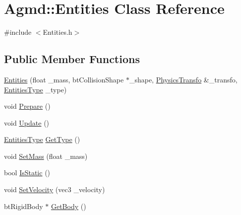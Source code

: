 \hypertarget{class_agmd_1_1_entities}{\section{Agmd\+:\+:Entities Class Reference}
\label{class_agmd_1_1_entities}
}


{\ttfamily \#include $<$Entities.\+h$>$}

\subsection*{Public Member Functions}
\begin{DoxyCompactItemize}
\item 
\hyperlink{class_agmd_1_1_entities_a932acd709716732b383f62e5ffb7277d}{Entities} (float \+\_\+mass, bt\+Collision\+Shape $\ast$\+\_\+shape, \hyperlink{struct_agmd_1_1_physics_transfo}{Physics\+Transfo} \&\+\_\+transfo, \hyperlink{namespace_agmd_a48e386dda635142e369ff15442b2a6ea}{Entities\+Type} \+\_\+type)
\item 
void \hyperlink{class_agmd_1_1_entities_aaef1e03cb169da068302e97a908d5c29}{Prepare} ()
\item 
void \hyperlink{class_agmd_1_1_entities_a47168fa50347e9d2415133339eb31054}{Update} ()
\item 
\hyperlink{namespace_agmd_a48e386dda635142e369ff15442b2a6ea}{Entities\+Type} \hyperlink{class_agmd_1_1_entities_aabd13db74541f1bca1d27f1cb864c638}{Get\+Type} ()
\item 
void \hyperlink{class_agmd_1_1_entities_a934201c790f65005b5801bb41ce3e054}{Set\+Mass} (float \+\_\+mass)
\item 
bool \hyperlink{class_agmd_1_1_entities_a681a27041cc1fc7f9709ed35a2f69c37}{Is\+Static} ()
\item 
void \hyperlink{class_agmd_1_1_entities_a1e9ff00bc5da4d0ebc2913452c1f338f}{Set\+Velocity} (vec3 \+\_\+velocity)
\item 
bt\+Rigid\+Body $\ast$ \hyperlink{class_agmd_1_1_entities_a5b675c40590dcb412f92e6a4447dd283}{Get\+Body} ()
\end{DoxyCompactItemize}


